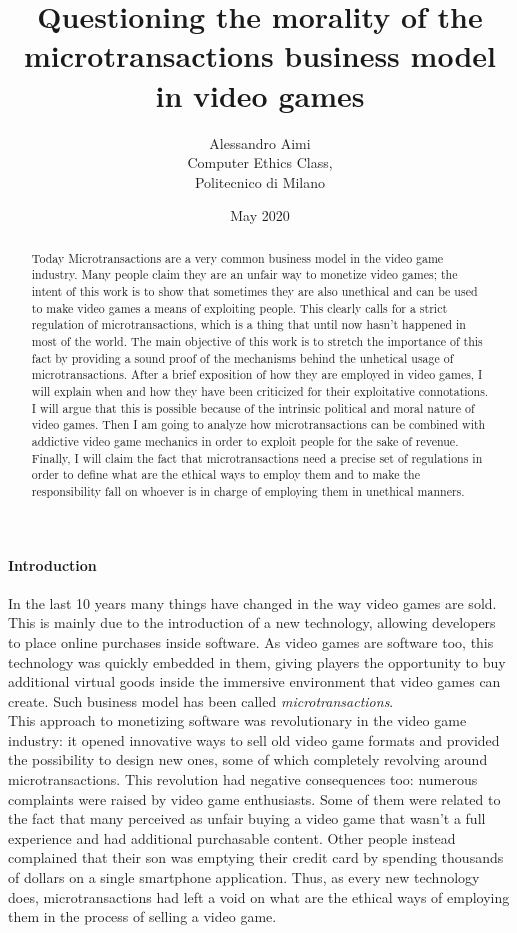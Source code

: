 \documentclass[10pt,a4paper]{article}
\title{\textbf{Questioning the morality of the microtransactions business model\\ in video games}}
\date{May 2020}
\author{Alessandro Aimi \\Computer Ethics Class, \\Politecnico di Milano}
\begin{document}
%
\maketitle
%
\begin{abstract}
Today Microtransactions are a very common business model in the video game industry.
Many people claim they are an unfair way to monetize video games; the intent of this work is to show that sometimes they are also unethical and can be used to make video games a means of exploiting people.
This clearly calls for a strict regulation of microtransactions, which is a thing that until now hasn't happened in most of the world.
The main objective of this work is to stretch the importance of this fact by providing a sound proof of the mechanisms behind the unhetical usage of microtransactions.
After a brief exposition of how they are employed in video games, I will explain when and how they have been criticized for their exploitative connotations. 
I will argue that this is possible because of the intrinsic political and moral nature of video games. Then I am going to analyze how microtransactions can be combined with addictive video game mechanics in order to exploit people for the sake of revenue.
Finally, I will claim the fact that microtransactions need a precise set of regulations in order to define what are the ethical ways to employ them and to make the responsibility fall on whoever is in charge of employing them in unethical manners.
\end{abstract}
%
\paragraph{Introduction}
In the last 10 years many things have changed in the way video games are sold.
This is mainly due to the introduction of a new technology, allowing developers to place online purchases inside software.
As video games are software too, this technology was quickly embedded in them, giving players the opportunity to buy additional virtual goods inside the immersive environment that video games can create.
Such business model has been called \textit{microtransactions}.\\ 
This approach to monetizing software was revolutionary in the video game industry: it opened innovative ways to sell old video game formats and provided the possibility to design new ones, some of which completely revolving around microtransactions.
This revolution had negative consequences too: numerous complaints were raised by video game enthusiasts.
Some of them were related to the fact that many perceived as unfair buying a video game that wasn't a full experience and had additional purchasable content.
Other people instead complained that their son was emptying their credit card by spending thousands of dollars on a single smartphone application.
Thus, as every new technology does, microtransactions had left a void on what are the ethical ways of employing them in the process of selling a video game.
\end{document}
